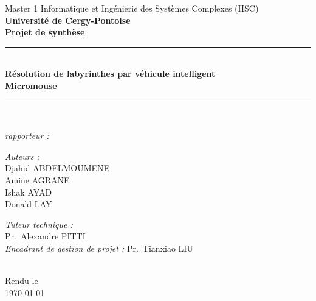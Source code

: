 \begin{titlepage}

\begin{center}

\AddToShipoutPicture*{\BackgroundPic}

{\large Master 1 Informatique et Ingénierie des Systèmes Complexes (IISC)}\\[0.5cm]

{\large \textbf{Université de Cergy-Pontoise}}\\[1.5cm]

{\large \textbf{Projet de synthèse}}\\[0.5cm]

\rule{\linewidth}{0.5mm} \\[0.4cm]
{ 
    \huge \bfseries Résolution de labyrinthes par véhicule intelligent \\[0.5cm]
    \huge Micromouse\\[0.4cm]
}
\rule{\linewidth}{0.5mm} \\[0.5cm]

\begin{center}
\begin{minipage}{0.5\textwidth}
   \large
    \emph{rapporteur :}

\end{minipage}%
\end{center}

\vspace{5mm}
\noindent
\begin{minipage}{0.5\textwidth}
  \begin{flushleft} \large
    \emph{Auteurs :}\\
    Djahid \textsc{ABDELMOUMENE}\\
    Amine \textsc{AGRANE}\\
    Ishak \textsc{AYAD}\\
    Donald \textsc{LAY}
  \end{flushleft}
\end{minipage}%
\begin{minipage}{0.5\textwidth}
  \begin{flushright} \large
    \emph{Tuteur technique :} \\
    Pr.~Alexandre \textsc{PITTI}\\
    \emph{Encadrant de gestion de projet :}
    Pr.~Tianxiao \textsc{LIU}
  \end{flushright}
\end{minipage}

 \\

\vspace*{\fill}
{\large Rendu le\\ \today}

\end{center}
\end{titlepage}
